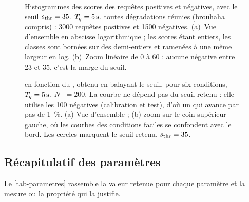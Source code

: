 \begin{figure}[t]
  \centering
  \caption{Histogrammes des scores des requêtes positives et négatives, avec le seuil
  $s_{\mathrm{thr}} = 35$. $T_q = \qty{5}{\second}$, toutes dégradations réunies (brouhaha compris) :
  \num{3000} requêtes positives et \num{1500} négatives. (a)~Vue d'ensemble en abscisse
  logarithmique ; les scores étant entiers, les classes sont bornées sur des demi-entiers et
  ramenées à une même largeur en log. (b)~Zoom linéaire de 0 à 60 : aucune négative entre
  23 et 35, c'est la marge du seuil.}
  \label{fig-histo-scores}
\end{figure}

\begin{figure}[t]
  \centering
  \caption{\TBD{} en fonction du \TFD{}, obtenu en balayant le seuil, pour six conditions,
  $T_q = \qty{5}{\second}$, $N^+ = 200$. La courbe ne dépend pas du seuil retenu : elle
  utilise les 100 négatives (calibration et test), d'où un \TFD{} qui avance par pas de
  \qty{1}{\percent}. (a) Vue d'ensemble ; (b) zoom sur le coin supérieur gauche, où les courbes
  des conditions faciles se confondent avec le bord. Les cercles marquent le seuil retenu,
  $s_{\mathrm{thr}} = 35$.}
  \label{fig-tbd-tfd}
\end{figure}

\subsection{Récapitulatif des paramètres}
\label{sec-parametres}

Le \cref{tab-parametres} rassemble la valeur retenue pour chaque paramètre et la mesure ou
la propriété qui la justifie.

